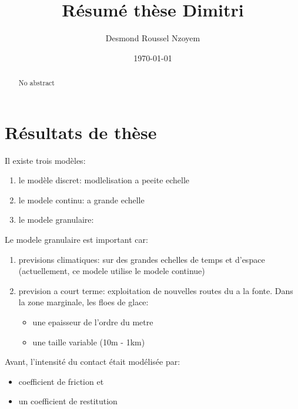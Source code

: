 \documentclass[
  french,
	10pt, %
]{fphw}
\title{Résumé thèse Dimitri} %
\author{Desmond Roussel Nzoyem} %
\date{\today} %
\institute{Université de Strasbourg \\ UFR de Mathématiques et Informatique} %
\begin{document}


\renewcommand{\abstractname}{Introduction}
\maketitle
\begin{abstract}
  \normalsize
  No abstract
\end{abstract}


\section{Résultats de thèse}

Il existe trois modèles:
\begin{enumerate}
  \item le modèle discret: modlelisation a peeite echelle
  \item le modele continu: a grande echelle
  \item le modele granulaire:
\end{enumerate}

Le modele granulaire est important car:
\begin{enumerate}
  \item previsions climatiques: sur des grandes echelles de temps et d'espace (actuellement, ce modele utilise le modele continue)
  \item prevision a court terme: exploitation de nouvelles routes du a la fonte. Dans la zone marginale, les floes de glace:
  \begin{itemize}
    \item une epaisseur de l'ordre du metre
    \item une taille variable (10m - 1km)
  \end{itemize}
\end{enumerate}

Avant, l'intensité du contact était modélisée par:
\begin{itemize}
  \item coefficient de friction et 
  \item un coefficient de restitution
\end{itemize}
\end{document}
